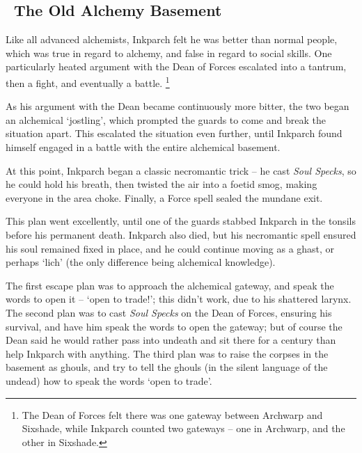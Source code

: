 \subsection[The Old Alchemy Basement]{~The Old Alchemy Basement~}
\label{old_alchemy_basement}


\begin{exampletext}
  Like all advanced alchemists, Inkparch felt he was better than normal people, which was true in regard to alchemy, and false in regard to social skills.
  One particularly heated argument with the Dean of Forces escalated into a tantrum, then a fight, and eventually a battle.%
  \footnote{The Dean of Forces felt there was one gateway between Archwarp and Sixshade, while Inkparch counted two gateways -- one in Archwarp, and the other in Sixshade.}

  As his argument with the Dean became continuously more bitter, the two began an alchemical `jostling', which prompted the guards to come and break the situation apart.
  This escalated the situation even further, until Inkparch found himself engaged in a battle with the entire alchemical basement.

  At this point, Inkparch began a classic necromantic trick -- he cast \textit{Soul Specks}, so he could hold his breath, then twisted the air into a foetid smog, making everyone in the area choke.
  Finally, a Force spell sealed the mundane exit.

  This plan went excellently, until one of the guards stabbed Inkparch in the tonsils before his permanent death.
  Inkparch also died, but his necromantic spell ensured his soul remained fixed in place, and he could continue moving as a ghast, or perhaps `lich' (the only difference being alchemical knowledge).

  The first escape plan was to approach the alchemical gateway, and speak the words to open it -- `open to trade!'; this didn't work, due to his shattered larynx.
  The second plan was to cast \textit{Soul Specks} on the Dean of Forces, ensuring his survival, and have him speak the words to open the gateway; but of course the Dean said he would rather pass into undeath and sit there for a century than help Inkparch with anything.
  The third plan was to raise the corpses in the basement as ghouls, and try to tell the ghouls (in the silent language of the undead) how to speak the words `open to trade'.


\end{exampletext}
